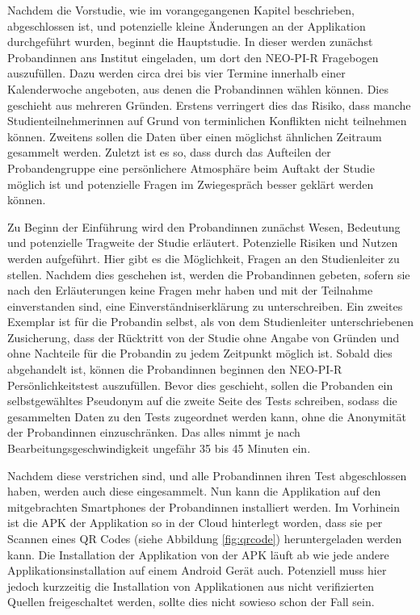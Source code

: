 Nachdem die Vorstudie, wie im vorangegangenen Kapitel beschrieben, abgeschlossen ist, und potenzielle kleine Änderungen an der Applikation durchgeführt wurden, beginnt die Hauptstudie.
In dieser werden zunächst Probandinnen ans Institut eingeladen, um dort den NEO-PI-R Fragebogen auszufüllen.
Dazu werden circa drei bis vier Termine innerhalb einer Kalenderwoche angeboten, aus denen die Probandinnen wählen können.
Dies geschieht aus mehreren Gründen. 
Erstens verringert dies das Risiko, dass manche Studienteilnehmerinnen auf Grund von terminlichen Konflikten nicht teilnehmen können.
Zweitens sollen die Daten über einen möglichst ähnlichen Zeitraum gesammelt werden.
Zuletzt ist es so, dass durch das Aufteilen der Probandengruppe eine persönlichere Atmosphäre beim Auftakt der Studie möglich ist
und potenzielle Fragen im Zwiegespräch besser geklärt werden können.
\par
Zu Beginn der Einführung wird den Probandinnen zunächst Wesen, Bedeutung und potenzielle Tragweite der Studie erläutert.
Potenzielle Risiken und Nutzen werden aufgeführt.
Hier gibt es die Möglichkeit, Fragen an den Studienleiter zu stellen.
Nachdem dies geschehen ist, werden die Probandinnen gebeten, sofern sie nach den Erläuterungen keine Fragen mehr haben und mit der Teilnahme einverstanden sind, eine Einverständniserklärung zu unterschreiben.
Ein zweites Exemplar ist für die Probandin selbst, als von dem Studienleiter unterschriebenen Zusicherung, dass der Rücktritt von der Studie ohne Angabe von Gründen und ohne Nachteile für die Probandin zu jedem Zeitpunkt möglich ist.
Sobald dies abgehandelt ist, können die Probandinnen beginnen den NEO-PI-R Persönlichkeitstest auszufüllen.
Bevor dies geschieht, sollen die Probanden ein selbstgewähltes Pseudonym auf die zweite Seite des Tests schreiben, sodass die gesammelten Daten zu den Tests zugeordnet werden kann, ohne die Anonymität der Probandinnen einzuschränken.
Das alles nimmt je nach Bearbeitungsgeschwindigkeit ungefähr 35 bis 45 Minuten ein.
\par
Nachdem diese verstrichen sind, und alle Probandinnen ihren Test abgeschlossen haben, werden auch diese eingesammelt.
Nun kann die Applikation auf den mitgebrachten Smartphones der Probandinnen installiert werden.
Im Vorhinein ist die APK der Applikation so in der Cloud hinterlegt worden, dass sie per Scannen eines QR Codes (siehe Abbildung \ref{fig:qrcode}) heruntergeladen werden kann.
Die Installation der Applikation von der APK läuft ab wie jede andere Applikationsinstallation auf einem Android Gerät auch.
Potenziell muss hier jedoch kurzzeitig die Installation von Applikationen aus nicht verifizierten Quellen freigeschaltet werden, sollte dies nicht sowieso schon der Fall sein.
